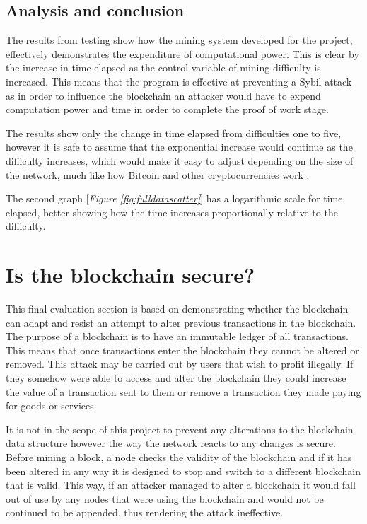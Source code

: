 \documentclass{l4proj}
\begin{document}
\subsection{Analysis and conclusion}
The results from testing show how the mining system developed for the project, effectively
demonstrates the expenditure of computational power. This is clear by the increase in time elapsed as the
control variable of mining difficulty is increased. This means that the program is effective at preventing a Sybil attack
as in order to influence the blockchain an attacker would have to expend computation power and time in order to complete
the proof of work stage.

The results show only the change in time elapsed from difficulties one to five, however it is safe to assume that the
exponential increase would continue as the difficulty increases, which would make it easy to adjust depending on the
size of the network, much like how Bitcoin and other cryptocurrencies work \citep{narayanan2016bitcoin}.

The second graph [\textit{Figure \ref{fig:fulldatascatter}}] has a logarithmic scale for time elapsed, better showing how the 
time increases proportionally relative to the difficulty.


\section{Is the blockchain secure?}
This final evaluation section is based on demonstrating whether the blockchain can adapt and resist an attempt to 
alter previous transactions in the blockchain. The purpose of a blockchain is to have an immutable ledger of all transactions.
This means that once transactions enter the blockchain they cannot be altered or removed. This attack may be carried out
by users that wish to profit illegally. If they somehow were able to access and alter the blockchain they could increase
the value of a transaction sent to them or remove a transaction they made paying for goods or services.

It is not in the scope of this project to prevent any alterations to the blockchain data structure however the way the
network reacts to any changes is secure. Before mining a block, a node checks the validity of the blockchain and if it
has been altered in any way it is designed to stop and switch to a different blockchain that is valid. This way, if an
attacker managed to alter a blockchain it would fall out of use by any nodes that were using the blockchain and would
not be continued to be appended, thus rendering the attack ineffective.
\end{document}
